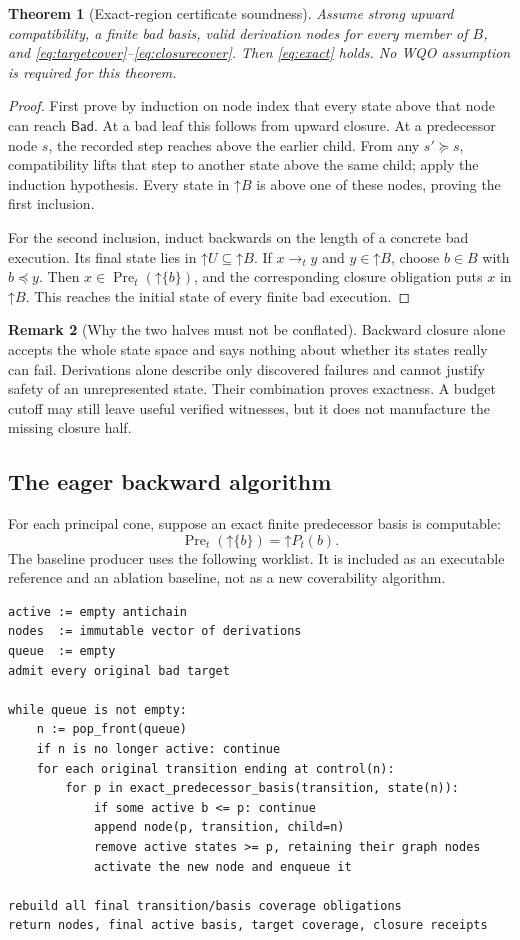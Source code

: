 \documentclass[11pt,a4paper]{article}
\newtheorem{theorem}{Theorem}[section]
\theoremstyle{definition}
\newtheorem{remark}[theorem]{Remark}
\newcommand{\Up}[1]{\mathord{\uparrow}#1}
\newcommand{\Pre}{\operatorname{Pre}}
\newcommand{\Bad}{\mathsf{Bad}}
\begin{document}
\begin{theorem}[Exact-region certificate soundness]
\label{thm:exact}
Assume strong upward compatibility, a finite bad basis, valid derivation
nodes for every member of $B$, and \eqref{eq:targetcover}--\eqref{eq:closurecover}.
Then \eqref{eq:exact} holds. No WQO assumption is required for this theorem.
\end{theorem}
\begin{proof}
First prove by induction on node index that every state above that node can
reach $\Bad$. At a bad leaf this follows from upward closure. At a predecessor
node $s$, the recorded step reaches above the earlier child. From any
$s'\succeq s$, compatibility lifts that step to another state above the same
child; apply the induction hypothesis. Every state in $\Up B$ is above one
of these nodes, proving the first inclusion.

For the second inclusion, induct backwards on the length of a concrete bad
execution. Its final state lies in $\Up U\subseteq\Up B$. If $x\to_t y$ and
$y\in\Up B$, choose $b\in B$ with $b\preceq y$. Then
$x\in\Pre_t(\Up{\{b\}})$, and the corresponding closure obligation puts
$x$ in $\Up B$. This reaches the initial state of every finite bad execution.
\end{proof}

\begin{remark}[Why the two halves must not be conflated]
Backward closure alone accepts the whole state space and says nothing about
whether its states really can fail. Derivations alone describe only discovered
failures and cannot justify safety of an unrepresented state. Their
combination proves exactness. A budget cutoff may still leave useful verified
witnesses, but it does not manufacture the missing closure half.
\end{remark}

\subsection{The eager backward algorithm}
For each principal cone, suppose an exact finite predecessor basis is
computable:
\[
 \Pre_t(\Up{\{b\}})=\Up{P_t(b)}.
\]
The baseline producer uses the following worklist. It is included as an
executable reference and an ablation baseline, not as a new coverability
algorithm.\cite{acjt,fs}
\begin{lstlisting}
active := empty antichain
nodes  := immutable vector of derivations
queue  := empty
admit every original bad target

while queue is not empty:
    n := pop_front(queue)
    if n is no longer active: continue
    for each original transition ending at control(n):
        for p in exact_predecessor_basis(transition, state(n)):
            if some active b <= p: continue
            append node(p, transition, child=n)
            remove active states >= p, retaining their graph nodes
            activate the new node and enqueue it

rebuild all final transition/basis coverage obligations
return nodes, final active basis, target coverage, closure receipts
\end{lstlisting}
\end{document}
